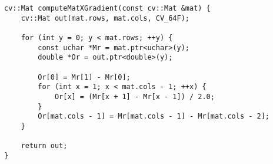 \begin{lstlisting}
cv::Mat computeMatXGradient(const cv::Mat &mat) {
	cv::Mat out(mat.rows, mat.cols, CV_64F);

	for (int y = 0; y < mat.rows; ++y) {
		const uchar *Mr = mat.ptr<uchar>(y);
		double *Or = out.ptr<double>(y);

		Or[0] = Mr[1] - Mr[0];
		for (int x = 1; x < mat.cols - 1; ++x) {
			Or[x] = (Mr[x + 1] - Mr[x - 1]) / 2.0;
		}
		Or[mat.cols - 1] = Mr[mat.cols - 1] - Mr[mat.cols - 2];
	}

	return out;
}
\end{lstlisting}